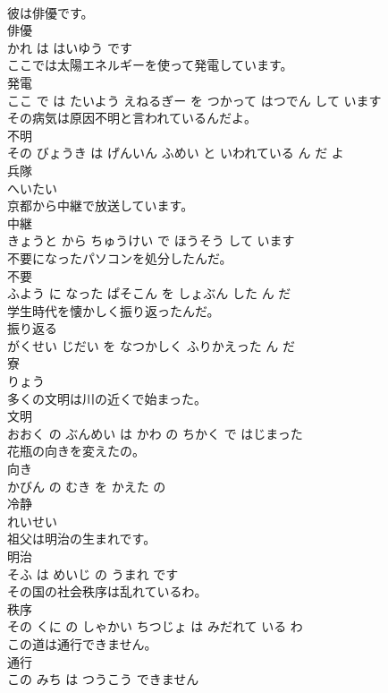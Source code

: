\documentclass[8pt]{extreport}
\begin{document}
\begin{CJK}{UTF8}{min}
\\	彼は俳優です。	
\\	俳優 
\\	かれ は はいゆう です			
\\	ここでは太陽エネルギーを使って発電しています。	
\\	発電 
\\	ここ で は たいよう えねるぎー を つかって はつでん して います			
\\	その病気は原因不明と言われているんだよ。	
\\	不明 
\\	その びょうき は げんいん ふめい と いわれている ん だ よ			
\\	兵隊	
\\	へいたい		
\\	京都から中継で放送しています。	
\\	中継 
\\	きょうと から ちゅうけい で ほうそう して います			
\\	不要になったパソコンを処分したんだ。	
\\	不要 
\\	ふよう に なった ぱそこん を しょぶん した ん だ			
\\	学生時代を懐かしく振り返ったんだ。	
\\	振り返る 
\\	がくせい じだい を なつかしく ふりかえった ん だ			
\\	寮	
\\	りょう		
\\	多くの文明は川の近くで始まった。	
\\	文明 
\\	おおく の ぶんめい は かわ の ちかく で はじまった			
\\	花瓶の向きを変えたの。	
\\	向き 
\\	かびん の むき を かえた の			
\\	冷静	
\\	れいせい		
\\	祖父は明治の生まれです。	
\\	明治 
\\	そふ は めいじ の うまれ です			
\\	その国の社会秩序は乱れているわ。	
\\	秩序 
\\	その くに の しゃかい ちつじょ は みだれて いる わ			
\\	この道は通行できません。	
\\	通行 
\\	この みち は つうこう できません			

\end{CJK}
\end{document}
